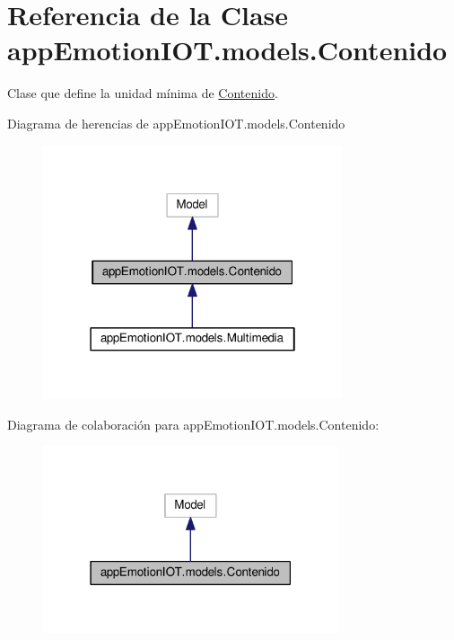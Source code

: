 \hypertarget{classappEmotionIOT_1_1models_1_1Contenido}{}\section{Referencia de la Clase app\+Emotion\+I\+O\+T.\+models.\+Contenido}
\label{classappEmotionIOT_1_1models_1_1Contenido}


Clase que define la unidad mínima de \hyperlink{classappEmotionIOT_1_1models_1_1Contenido}{Contenido}.  




Diagrama de herencias de app\+Emotion\+I\+O\+T.\+models.\+Contenido
\nopagebreak
\begin{figure}[H]
\begin{center}
\leavevmode
\includegraphics[width=250pt]{classappEmotionIOT_1_1models_1_1Contenido__inherit__graph}
\end{center}
\end{figure}


Diagrama de colaboración para app\+Emotion\+I\+O\+T.\+models.\+Contenido\+:
\nopagebreak
\begin{figure}[H]
\begin{center}
\leavevmode
\includegraphics[width=247pt]{classappEmotionIOT_1_1models_1_1Contenido__coll__graph}
\end{center}
\end{figure}
